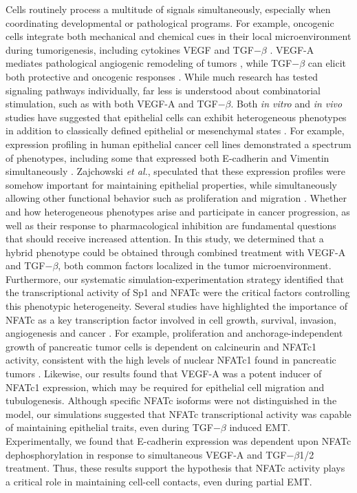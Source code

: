 \documentclass[12pt]{article}
\begin{document}
Cells routinely process a multitude of signals simultaneously, especially when coordinating developmental or pathological programs.
For example, oncogenic cells integrate both mechanical and chemical cues in their local microenvironment during tumorigenesis, including cytokines VEGF and TGF$-\beta$ \citep{Hong:2013mi}.
VEGF-A mediates pathological angiogenic remodeling of tumors \citep{Nagy:2007lh}, while TGF$-\beta$ can elicit both protective and oncogenic responses \citep{Ferrara:2002kx,Willis:2007uq}.
While much research has tested signaling pathways individually, far less is understood about combinatorial stimulation, such as with both VEGF-A and TGF$-\beta$.
Both \emph{in vitro} and \emph{in vivo} studies have suggested that epithelial cells can exhibit heterogeneous phenotypes in addition to classically defined epithelial or mesenchymal states \citep{Polyak2009,Strauss:2011fk}.
For example, expression profiling in human epithelial cancer cell lines demonstrated a spectrum of phenotypes, including some that expressed both E-cadherin and Vimentin simultaneously \citep{Neve:2006uq,Welch-Reardon:2014aa}.
Zajchowski \emph{et al.}, speculated that these expression profiles were somehow important for maintaining epithelial properties, while simultaneously allowing other functional behavior such as proliferation and migration \citep{Zajchowski:2001kx}.
Whether and how heterogeneous phenotypes arise and participate in cancer progression, as well as their response to pharmacological inhibition are fundamental questions
that should receive increased attention.
In this study, we determined that a hybrid phenotype could be obtained through combined treatment with VEGF-A and TGF$-\beta$, both common factors localized in the tumor microenvironment.
Furthermore, our systematic simulation-experimentation strategy identified that the transcriptional activity of Sp1 and NFATc were the critical factors controlling this phenotypic heterogeneity.
Several studies have highlighted the importance of NFATc as a key transcription factor involved in cell growth, survival, invasion, angiogenesis and cancer \citep{Mancini2009}.
For example, proliferation and anchorage-independent growth of pancreatic tumor cells is dependent on calcineurin and NFATc1 activity, consistent with the high levels of nuclear NFATc1 found in pancreatic tumors \citep{Singh:2010jx}.
Likewise, our results found that VEGF-A was a potent inducer of NFATc1 expression, which may be required for epithelial cell migration and tubulogenesis.
Although specific NFATc isoforms were not distinguished in the model, our simulations suggested that NFATc transcriptional activity was capable of maintaining epithelial traits, even during TGF$-\beta$ induced EMT.
Experimentally, we found that E-cadherin expression was dependent upon NFATc dephosphorylation in response to simultaneous VEGF-A and TGF$-\beta$1/2 treatment.
Thus, these results support the hypothesis that NFATc activity plays a critical role in maintaining cell-cell contacts, even during partial EMT.
\end{document}
